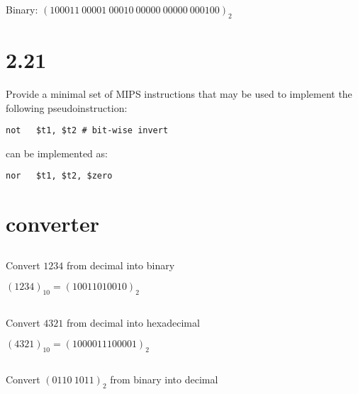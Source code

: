 \documentclass[paper=a4, fontsize=11pt]{scrartcl} %
\begin{document}
Binary: ${(100011\ 00001\ 00010\ 00000\ 00000\ 000100)}_2$


\section{2.21}

\begin{fancyquotes}
  Provide a minimal set of MIPS instructions that may be used to
  implement the following pseudoinstruction:
\end{fancyquotes}

\begin{lstlisting}[language={[mips]Assembler}]
  not	$t1, $t2 # bit-wise invert
\end{lstlisting}                %

can be implemented as:

\begin{lstlisting}[language={[mips]Assembler}]
  nor	$t1, $t2, $zero
\end{lstlisting}                %


\section{converter}

\subsection{}
\begin{fancyquotes}
  Convert $1234$ from decimal into binary
\end{fancyquotes}

${(1234)}_{10} = {(10011010010)}_2$

\subsection{}
\begin{fancyquotes}
  Convert $4321$ from decimal into hexadecimal
\end{fancyquotes}

${(4321)}_{10} = {(1000011100001)}_2$

\subsection{}
\begin{fancyquotes}
  Convert ${(0110\ 1011)}_2$ from binary into decimal
\end{fancyquotes}
\end{document}
